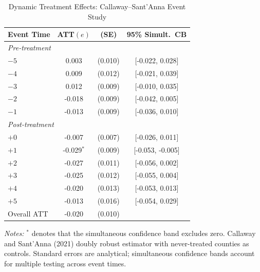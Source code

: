 \begin{table}[t]
\centering
\caption{Dynamic Treatment Effects: Callaway--Sant'Anna Event Study}
\label{tab:event}
\begin{tabular}{lccc}
\toprule
Event Time & ATT$(e)$ & (SE) & 95\% Simult.\ CB \\
\midrule
\multicolumn{4}{l}{\textit{Pre-treatment}} \\
  $-5$ & 0.003 & (0.010) & [-0.022, 0.028] \\
  $-4$ & 0.009 & (0.012) & [-0.021, 0.039] \\
  $-3$ & 0.012 & (0.009) & [-0.010, 0.035] \\
  $-2$ & -0.018 & (0.009) & [-0.042, 0.005] \\
  $-1$ & -0.013 & (0.009) & [-0.036, 0.010] \\
\midrule
\multicolumn{4}{l}{\textit{Post-treatment}} \\
  $+0$ & -0.007 & (0.007) & [-0.026, 0.011] \\
  $+1$ & -0.029$^{*}$ & (0.009) & [-0.053, -0.005] \\
  $+2$ & -0.027 & (0.011) & [-0.056, 0.002] \\
  $+3$ & -0.025 & (0.012) & [-0.055, 0.004] \\
  $+4$ & -0.020 & (0.013) & [-0.053, 0.013] \\
  $+5$ & -0.013 & (0.016) & [-0.054, 0.029] \\
\midrule
Overall ATT & -0.020 & (0.010) & \\
\bottomrule
\end{tabular}

\vspace{0.3em}
{\small \textit{Notes:} $^{*}$ denotes that the simultaneous confidence band excludes zero. Callaway and Sant'Anna (2021) doubly robust estimator with never-treated counties as controls. Standard errors are analytical; simultaneous confidence bands account for multiple testing across event times.}
\end{table}
